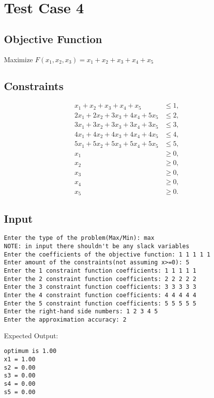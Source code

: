 \documentclass[12pt, legalpaper]{exam}
\begin{document}
\section*{Test Case 4}
\subsection*{Objective Function}
Maximize \( F(x_1, x_2, x_3) = x_1 + x_2 + x_3 + x_4 + x_5 \)
\subsection*{Constraints}
\begin{align*}
    x_1 + x_2 + x_3 + x_4 + x_5 &\leq 1, \\
    2x_1 + 2x_2 + 3x_3 + 4x_4 + 5x_5 &\leq 2, \\
    3x_1 + 3x_2 + 3x_3 + 3x_4 + 3x_5 &\leq 3, \\
    4x_1 + 4x_2 + 4x_3 + 4x_4 + 4x_5 &\leq 4, \\
    5x_1 + 5x_2 + 5x_3 + 5x_4 + 5x_5 &\leq 5, \\
    x_1 &\geq 0, \\
    x_2 &\geq 0, \\
    x_3 &\geq 0, \\
    x_4 &\geq 0, \\
    x_5 &\geq 0.
\end{align*}
 
\subsection*{Input}
\begin{verbatim}
Enter the type of the problem(Max/Min): max
NOTE: in input there shouldn't be any slack variables
Enter the coefficients of the objective function: 1 1 1 1 1
Enter amount of the constraints(not assuming x>=0): 5
Enter the 1 constraint function coefficients: 1 1 1 1 1
Enter the 2 constraint function coefficients: 2 2 2 2 2
Enter the 3 constraint function coefficients: 3 3 3 3 3
Enter the 4 constraint function coefficients: 4 4 4 4 4
Enter the 5 constraint function coefficients: 5 5 5 5 5
Enter the right-hand side numbers: 1 2 3 4 5
Enter the approximation accuracy: 2
\end{verbatim}
 
Expected Output:
\begin{verbatim}
optimum is 1.00
x1 = 1.00
s2 = 0.00
s3 = 0.00
s4 = 0.00
s5 = 0.00
\end{verbatim}
 
\end{document}
